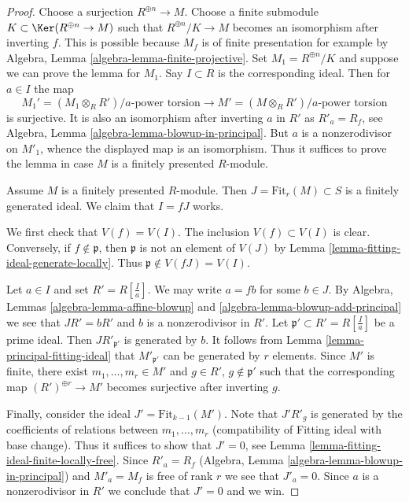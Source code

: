 \begin{proof}
Choose a surjection $R^{\oplus n} \to M$. Choose a finite submodule
$K \subset \Ker(R^{\oplus n} \to M)$ such that $R^{\oplus n}/K \to M$
becomes an isomorphism after inverting $f$. This is possible because
$M_f$ is of finite presentation for example by
Algebra, Lemma \ref{algebra-lemma-finite-projective}.
Set $M_1 = R^{\oplus n}/K$
and suppose we can prove the lemma for $M_1$. Say $I \subset R$ is the
corresponding ideal. Then for $a \in I$ the map
$$
M_1' = (M_1 \otimes_R R')/a\text{-power torsion}
\longrightarrow
M' = (M \otimes_R R')/a\text{-power torsion}
$$
is surjective. It is also an isomorphism after inverting $a$ in $R'$
as $R'_a = R_f$, see Algebra, Lemma \ref{algebra-lemma-blowup-in-principal}.
But $a$ is a nonzerodivisor on $M'_1$, whence the displayed map is an
isomorphism. Thus it suffices to prove the lemma in case $M$ is a finitely
presented $R$-module.

\medskip\noindent
Assume $M$ is a finitely presented $R$-module.
Then $J = \text{Fit}_r(M) \subset S$ is a finitely generated ideal.
We claim that $I = fJ$ works.

\medskip\noindent
We first check that $V(f) = V(I)$. The inclusion $V(f) \subset V(I)$ is
clear. Conversely, if $f \not \in \mathfrak p$, then
$\mathfrak p$ is not an element of $V(J)$ by 
Lemma \ref{lemma-fitting-ideal-generate-locally}.
Thus $\mathfrak p \not \in V(fJ) = V(I)$.

\medskip\noindent
Let $a \in I$ and set $R' = R[\frac{I}{a}]$. We may write $a = fb$
for some $b \in J$. By Algebra, Lemmas \ref{algebra-lemma-affine-blowup} and
\ref{algebra-lemma-blowup-add-principal} we see that $J R' = b R'$
and $b$ is a nonzerodivisor in $R'$. 
Let $\mathfrak p' \subset R' = R[\frac{I}{a}]$ be
a prime ideal. Then $JR'_{\mathfrak p'}$ is generated by $b$.
It follows from
Lemma \ref{lemma-principal-fitting-ideal}
that $M'_{\mathfrak p'}$ can be generated by $r$ elements.
Since $M'$ is finite, there exist $m_1, \ldots, m_r \in M'$ and
$g \in R'$, $g \not \in \mathfrak p'$ such that the corresponding map
$(R')^{\oplus r} \to M'$ becomes surjective after inverting $g$.

\medskip\noindent
Finally, consider the ideal $J' = \text{Fit}_{k - 1}(M')$.
Note that $J' R'_g$ is generated by the coefficients of relations between
$m_1, \ldots, m_r$ (compatibility of Fitting ideal with base change).
Thus it suffices to show that $J' = 0$, see
Lemma \ref{lemma-fitting-ideal-finite-locally-free}.
Since $R'_a = R_f$ (Algebra, Lemma \ref{algebra-lemma-blowup-in-principal})
and $M'_a = M_f$ is free of rank $r$ we see that $J'_a = 0$.
Since $a$ is a nonzerodivisor in $R'$ we
conclude that $J' = 0$ and we win.
\end{proof}












